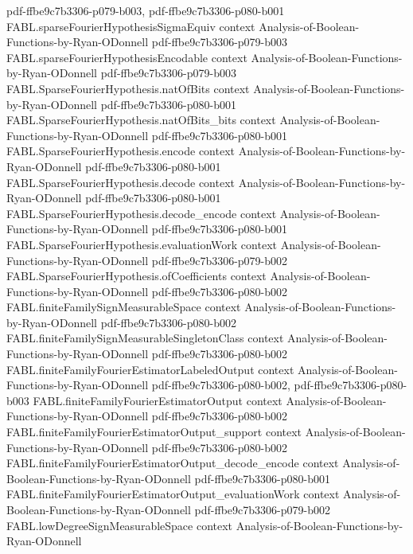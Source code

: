 \begin{theorem}
  {pdf-ffbe9c7b3306-p079-b003,
    pdf-ffbe9c7b3306-p080-b001}
\proofstep
  {FABL.sparseFourierHypothesisSigmaEquiv}
  {context}
  {Analysis-of-Boolean-Functions-by-Ryan-ODonnell}
  {pdf-ffbe9c7b3306-p079-b003}
\proofstep
  {FABL.sparseFourierHypothesisEncodable}
  {context}
  {Analysis-of-Boolean-Functions-by-Ryan-ODonnell}
  {pdf-ffbe9c7b3306-p079-b003}
\proofstep
  {FABL.SparseFourierHypothesis.natOfBits}
  {context}
  {Analysis-of-Boolean-Functions-by-Ryan-ODonnell}
  {pdf-ffbe9c7b3306-p080-b001}
\proofstep
  {FABL.SparseFourierHypothesis.natOfBits_bits}
  {context}
  {Analysis-of-Boolean-Functions-by-Ryan-ODonnell}
  {pdf-ffbe9c7b3306-p080-b001}
\proofstep
  {FABL.SparseFourierHypothesis.encode}
  {context}
  {Analysis-of-Boolean-Functions-by-Ryan-ODonnell}
  {pdf-ffbe9c7b3306-p080-b001}
\proofstep
  {FABL.SparseFourierHypothesis.decode}
  {context}
  {Analysis-of-Boolean-Functions-by-Ryan-ODonnell}
  {pdf-ffbe9c7b3306-p080-b001}
\proofstep
  {FABL.SparseFourierHypothesis.decode_encode}
  {context}
  {Analysis-of-Boolean-Functions-by-Ryan-ODonnell}
  {pdf-ffbe9c7b3306-p080-b001}
\proofstep
  {FABL.SparseFourierHypothesis.evaluationWork}
  {context}
  {Analysis-of-Boolean-Functions-by-Ryan-ODonnell}
  {pdf-ffbe9c7b3306-p079-b002}
\proofstep
  {FABL.SparseFourierHypothesis.ofCoefficients}
  {context}
  {Analysis-of-Boolean-Functions-by-Ryan-ODonnell}
  {pdf-ffbe9c7b3306-p080-b002}
\proofstep
  {FABL.finiteFamilySignMeasurableSpace}
  {context}
  {Analysis-of-Boolean-Functions-by-Ryan-ODonnell}
  {pdf-ffbe9c7b3306-p080-b002}
\proofstep
  {FABL.finiteFamilySignMeasurableSingletonClass}
  {context}
  {Analysis-of-Boolean-Functions-by-Ryan-ODonnell}
  {pdf-ffbe9c7b3306-p080-b002}
\proofstep
  {FABL.finiteFamilyFourierEstimatorLabeledOutput}
  {context}
  {Analysis-of-Boolean-Functions-by-Ryan-ODonnell}
  {pdf-ffbe9c7b3306-p080-b002,
    pdf-ffbe9c7b3306-p080-b003}
\proofstep
  {FABL.finiteFamilyFourierEstimatorOutput}
  {context}
  {Analysis-of-Boolean-Functions-by-Ryan-ODonnell}
  {pdf-ffbe9c7b3306-p080-b002}
\proofstep
  {FABL.finiteFamilyFourierEstimatorOutput_support}
  {context}
  {Analysis-of-Boolean-Functions-by-Ryan-ODonnell}
  {pdf-ffbe9c7b3306-p080-b002}
\proofstep
  {FABL.finiteFamilyFourierEstimatorOutput_decode_encode}
  {context}
  {Analysis-of-Boolean-Functions-by-Ryan-ODonnell}
  {pdf-ffbe9c7b3306-p080-b001}
\proofstep
  {FABL.finiteFamilyFourierEstimatorOutput_evaluationWork}
  {context}
  {Analysis-of-Boolean-Functions-by-Ryan-ODonnell}
  {pdf-ffbe9c7b3306-p079-b002}
\proofstep
  {FABL.lowDegreeSignMeasurableSpace}
  {context}
  {Analysis-of-Boolean-Functions-by-Ryan-ODonnell}

\end{theorem}
